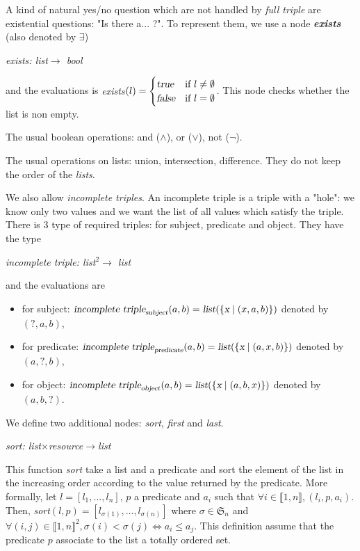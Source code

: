 A kind of natural yes/no question which are not handled by \textsl{full triple} are existential questions: "Is there a... ?". To represent them, we use a node \textsl{\bf exists} (also denoted by $\exists$)
\begin{center}
\textsl{exists: list$\rightarrow$ bool}
\end{center}
and the evaluations is \textsl{exists$(l) = \begin{cases}
\textsl{true} & \text{if }l\neq\emptyset\\
\textsl{false} & \text{if }l=\emptyset
\end{cases}$}. This node checks whether the list is non empty.

The usual boolean operations: and ($\wedge$), or ($\vee$), not ($\neg$).

\bigskip

The usual operations on lists: union, intersection, difference. They do not keep the order of the \textsl{lists}.

We also allow \textsl{incomplete triples}. An incomplete triple is a triple with a "hole": we know only two values and we want the list of all values which satisfy the triple. There is 3 type of required triples: for subject, predicate and object. They have the type
\begin{center}
\textsl{incomplete triple: list$^2\rightarrow$ list}
\end{center}
and the evaluations are
\begin{itemize}
    \item for subject: $\textsl{incomplete triple}_{\textsl{subject}}(a,b) = \textsl{list}(\{\textsl{x}\mid(x,a,b)\})$ denoted by $(?,a,b)$,
    \item for predicate: $\textsl{incomplete triple}_{\textsl{predicate}}(a,b) = \textsl{list}(\{\textsl{x}\mid(a,x,b)\})$ denoted by $(a,?,b)$,
    \item for object: $\textsl{incomplete triple}_{\textsl{object}}(a,b) = \textsl{list}(\{\textsl{x}\mid(a,b,x)\})$ denoted by $(a,b,?)$.
\end{itemize}

We define two additional nodes: \textsl{sort}, \textsl{first} and \textsl{last}.

\begin{center}
\textsl{sort: list$\times$resource$\rightarrow$list}
\end{center}
This function \textsl{sort} take a list and a predicate and sort the element of the list in the increasing order according to the value returned by the predicate. More formally, let $l=[l_1,\ldots,l_n]$, $p$ a predicate and $a_i$ such that $\forall i\in\llbracket1,n\rrbracket, (l_i,p,a_i)$. Then, \textsl{sort}$(l,p) = [l_{\sigma(1)},\ldots,l_{\sigma(n)}]$ where $\sigma\in\mathfrak{S}_n$ and $\forall (i,j)\in\llbracket 1,n\rrbracket^2, \sigma(i)<\sigma(j) \Leftrightarrow a_i \leqslant a_j$. This definition assume that the predicate $p$ associate to the list a totally ordered set.


